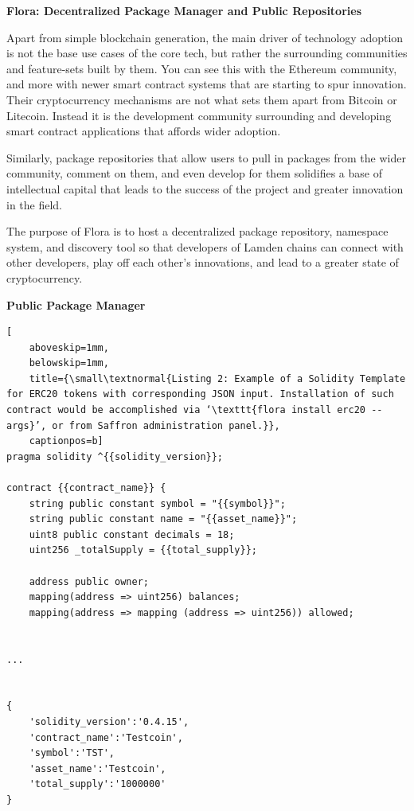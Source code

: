 \documentclass{%
	article}
\begin{document}
\begin{center}
\textbf{Flora: Decentralized Package Manager and Public Repositories}
\end{center}

Apart from simple blockchain generation, the main driver of technology adoption is not the base use cases of the core tech, but rather the surrounding communities and feature-sets built by them. You can see this with the Ethereum community, and more with newer smart contract systems that are starting to spur innovation. Their cryptocurrency mechanisms are not what sets them apart from Bitcoin or Litecoin. Instead it is the development community surrounding and developing smart contract applications that affords wider adoption\cite{techecosystems}.

Similarly, package repositories that allow users to pull in packages from the wider community, comment on them, and even develop for them solidifies a base of intellectual capital that leads to the success of the project and greater innovation in the field.

The purpose of Flora is to host a decentralized package repository, namespace system, and discovery tool so that developers of Lamden chains can connect with other developers, play off each other's innovations, and lead to a greater state of cryptocurrency.

\begin{center}
\textbf{Public Package Manager}
\end{center}

\begin{lstlisting}[
	aboveskip=1mm,
	belowskip=1mm,
	title={\small\textnormal{Listing 2: Example of a Solidity Template for ERC20 tokens with corresponding JSON input. Installation of such contract would be accomplished via ‘\texttt{flora install erc20 --args}’, or from Saffron administration panel.}},
	captionpos=b]
pragma solidity ^{{solidity_version}};

contract {{contract_name}} {
    string public constant symbol = "{{symbol}}";
    string public constant name = "{{asset_name}}";
    uint8 public constant decimals = 18;
    uint256 _totalSupply = {{total_supply}};

    address public owner;
    mapping(address => uint256) balances;
    mapping(address => mapping (address => uint256)) allowed;
   
    
...


{
    'solidity_version':'0.4.15',
    'contract_name':'Testcoin',
    'symbol':'TST',
    'asset_name':'Testcoin',
    'total_supply':'1000000'
}
\end{lstlisting}
\end{document}
